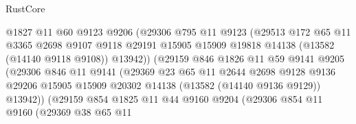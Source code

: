 \begin{lexlean}{RustCore}
\begin{coremodule}
                              @1827
                              @11
                              @60
                              @9123
                              @9206
                              (@29306
                                @795
                                @11
                                @9123
                                (@29513
                                  @172
                                  @65
                                  @11
                                  @3365
                                  @2698
                                  @9107
                                  @9118
                                  @29191
                                  @15905
                                  @15909
                                  @19818
                                  @14138
                                  (@13582 (@14140 @9118 @9108))
                                  @13942))
                              (@29159
                                @846
                                @1826
                                @11
                                @59
                                @9141
                                @9205
                                (@29306
                                  @846
                                  @11
                                  @9141
                                  (@29369
                                    @23
                                    @65
                                    @11
                                    @2644
                                    @2698
                                    @9128
                                    @9136
                                    @29206
                                    @15905
                                    @15909
                                    @20302
                                    @14138
                                    (@13582 (@14140 @9136 @9129))
                                    @13942))
                                (@29159
                                  @854
                                  @1825
                                  @11
                                  @44
                                  @9160
                                  @9204
                                  (@29306
                                    @854
                                    @11
                                    @9160
                                    (@29369
                                      @38
                                      @65
                                      @11

\end{coremodule}
\end{lexlean}
